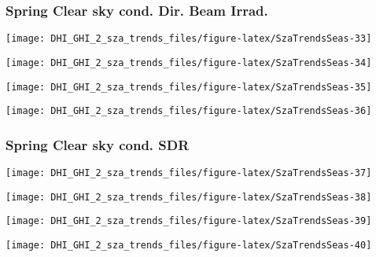 \documentclass[
  10pt,
  a4paper,oneside]{article}
\begin{document}
\newpage

\hypertarget{spring-clear-sky-cond.-dir.-beam-irrad.}{%
\subsubsection{Spring Clear sky cond. Dir. Beam Irrad.}\label{spring-clear-sky-cond.-dir.-beam-irrad.}}

\begin{center}\texttt{[image: DHI\_GHI\_2\_sza\_trends\_files/figure-latex/SzaTrendsSeas-33]} \end{center}

\begin{center}\texttt{[image: DHI\_GHI\_2\_sza\_trends\_files/figure-latex/SzaTrendsSeas-34]} \end{center}

\begin{center}\texttt{[image: DHI\_GHI\_2\_sza\_trends\_files/figure-latex/SzaTrendsSeas-35]} \end{center}

\begin{center}\texttt{[image: DHI\_GHI\_2\_sza\_trends\_files/figure-latex/SzaTrendsSeas-36]} \end{center}

\newpage

\hypertarget{spring-clear-sky-cond.-sdr}{%
\subsubsection{Spring Clear sky cond. SDR}\label{spring-clear-sky-cond.-sdr}}

\begin{center}\texttt{[image: DHI\_GHI\_2\_sza\_trends\_files/figure-latex/SzaTrendsSeas-37]} \end{center}

\begin{center}\texttt{[image: DHI\_GHI\_2\_sza\_trends\_files/figure-latex/SzaTrendsSeas-38]} \end{center}

\begin{center}\texttt{[image: DHI\_GHI\_2\_sza\_trends\_files/figure-latex/SzaTrendsSeas-39]} \end{center}

\begin{center}\texttt{[image: DHI\_GHI\_2\_sza\_trends\_files/figure-latex/SzaTrendsSeas-40]} \end{center}
\end{document}

